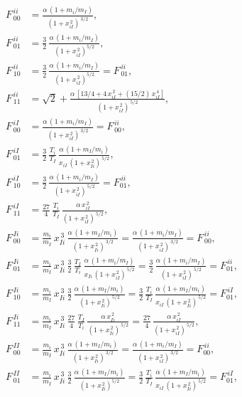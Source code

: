 \documentclass[12pt]{article}
\begin{document}
\begin{align}
F^{\,ii}_{\,00} &= \frac{\alpha\,(1+m_i/m_I)}{(1+x_{iI}^{\,2})^{\,3/2}},\\[0.5ex]
F^{\,ii}_{\,01}&=\frac{3}{2}\,\frac{\alpha\,(1+m_i/m_I)}{(1+x_{iI}^{\,2})^{5/2}},\\[0.5ex]
F^{\,ii}_{\,10}&=\frac{3}{2}\,\frac{\alpha\,(1+m_i/m_I)}{(1+x_{iI}^{\,2})^{5/2}}=F^{\,ii}_{\,01},\\[0.5ex]
F^{\,ii}_{\,11}& =\sqrt{2}+ \frac{\alpha\,[13/4+4\,x_{iI}^{\,2}+(15/2)\,x_{iI}^{\,4}]}{(1+x_{iI}^{\,2})^{\,5/2}},\\[0.5ex]
F^{\,iI}_{\,00} &=\frac{\alpha\,(1+m_i/m_I)}{(1+x_{iI}^{\,2})^{\,3/2}}=F^{\,ii}_{\,00},\\[0.5ex]
F^{\,iI}_{\,01}&= \frac{3}{2}\,\frac{T_i}{T_I}\,\frac{\alpha\,(1+m_I/m_i)}{x_{iI}\,(1+x_{Ii}^{\,2})^{\,5/2}},\\[0.5ex]
F^{\,iI}_{\,10}&=\frac{3}{2}\,\frac{\alpha\,(1+m_i/m_I)}{(1+x_{iI}^{\,2})^{\,5/2}}=F^{\,ii}_{01},\\[0.5ex]
F^{\,iI}_{\,11}& =\frac{27}{4}\,\frac{T_i}{T_I}\,\frac{\alpha\,x_{iI}^{\,2}}{(1+x_{iI}^{\,2})^{\,5/2}},\\[0.5ex]
F^{\,Ii}_{\,00} &=\frac{m_i}{m_I}\,x_{Ii}^{\,3}\,\frac{\alpha\,(1+m_I/m_i)}{(1+x_{Ii}^{\,2})^{\,3/2}}=
\frac{\alpha\,(1+m_i/m_I)}{(1+x_{iI}^{\,2})^{\,3/2}}=F^{\,ii}_{\,00},\\[0.5ex]
F^{\,Ii}_{\,01}&=\frac{m_i}{m_I}\,x_{Ii}^{\,3}\,\frac{3}{2}\,\frac{T_I}{T_i}\,\frac{\alpha\,(1+m_i/m_I)}{x_{Ii}\,(1+x_{iI}^{\,2})^{\,5/2}}=\frac{3}{2}\,\frac{\alpha\,(1+m_i/m_I)}{(1+x_{iI}^{\,2})^{\,5/2}}=F^{\,ii}_{01},\\[0.5ex]
F^{\,Ii}_{\,10}&=\frac{m_i}{m_I}\,x_{Ii}^{\,3}\,\frac{3}{2}\,\frac{\alpha\,(1+m_I/m_i)}{(1+x_{Ii}^{\,2})^{\,5/2}}=\frac{3}{2}\,\frac{T_i}{T_I}\,\frac{\alpha\,(1+m_I/m_i)}{x_{iI}\,(1+x_{Ii}^{\,2})^{\,5/2}}=F^{\,iI}_{01},\\[0.5ex]
F^{\,Ii}_{\,11}& =\frac{m_i}{m_I}\,x_{Ii}^{\,3}\,\frac{27}{4}\,\frac{T_I}{T_i}\,\frac{\alpha\,x_{Ii}^{\,2}}{(1+x_{Ii}^{\,2})^{\,5/2}}=\frac{27}{4}\,\frac{\alpha\,x_{iI}^{\,2}}{(1+x_{iI}^{\,2})^{\,5/2}},\\[0.5ex]
F^{\,II}_{\,00} &= \frac{m_i}{m_I}\,x_{Ii}^{\,3}\,\frac{\alpha\,(1+m_I/m_i)}{(1+x_{Ii}^{\,2})^{\,3/2}}=\frac{\alpha\,(1+m_i/m_I)}{(1+x_{iI}^{\,2})^{\,3/2}}=F^{\,ii}_{00},\\[0.5ex]
F^{\,II}_{\,01}&=\frac{m_i}{m_I}\,x_{Ii}^{\,3}\,\frac{3}{2}\,\frac{\alpha\,(1+m_I/m_i)}{(1+x_{Ii}^{\,2})^{5/2}}
=\frac{3}{2}\,\frac{T_i}{T_I}\,\frac{\alpha\,(1+m_I/m_i)}{x_{iI}\,(1+x_{Ii}^{\,2})^{\,5/2}}=F^{\,iI}_{01},\\[0.5ex]

\end{align}
\end{document}
